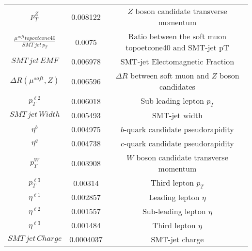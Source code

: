 \begin{tabular}{ccc}
$p_{T}^{Z}$  &  0.008122  &  $Z$ boson candidate transverse momentum  \\
$\frac{\mu^{soft} topoetcone40}{SMT\,jet\,p_{T}}$  &  0.0075  &  Ratio between the soft muon topoetcone40 and SMT-jet pT  \\
$SMT\,jet\,EMF$  &  0.006978  &  SMT-jet Electomagnetic Fraction  \\
$\Delta R(\mu^{soft},Z)$  &  0.006596  &  $\Delta R$ between soft muon and $Z$ boson candidates  \\
$p_{T}^{\ell2}$  &  0.006018  &  Sub-leading lepton $p_{T}$  \\
$SMT\,jet\,Width$  &  0.005493  &  SMT-jet width  \\
$\eta^{b}$  &  0.004975  &  $b$-quark candidate pseudorapidity  \\
$\eta^{q}$  &  0.004738  &  $c$-quark candidate pseudorapidity  \\
$p_{T}^{W}$  &  0.003908  &  $W$ boson candidate transverse momentum  \\
$p_{T}^{\ell3}$  &  0.00314  &  Third lepton $p_{T}$  \\
$\eta^{\ell1}$  &  0.002857  &  Leading lepton $\eta$  \\
$\eta^{\ell2}$  &  0.001557  &  Sub-leading lepton $\eta$  \\
$\eta^{\ell3}$  &  0.001484  &  Third lepton $\eta$  \\
$SMT\,jet\,Charge$  &  0.0004037  &  SMT-jet charge  \\
\bottomrule
\end{tabular}
%

